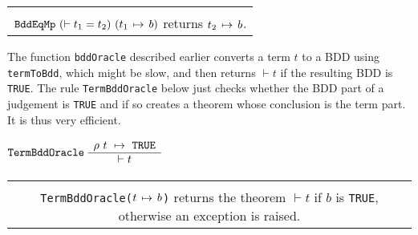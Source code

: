 \documentclass[12pt]{article}
\newcommand{\bnind}[1]{\index[MLbn]{#1}}
\newlength{\minipagewidth}
\newcommand{\ty}[1]{\mbox{\tt #1}}
\newcommand{\ml}[1]{{\tt #1}}
\newcommand{\termbdd}[3]{\mbox{$#1~#2~\mapsto~#3$}}
\newcommand{\globtermbdd}[2]{\mbox{$#1\hspace{0.5mm}\mapsto\hspace{0.5mm}#2$}}
\newcommand\termbddty{\ty{term\_bdd}}
\newcommand\fun{\mbox{\tt{->}}}
\begin{document}
\vspace*{-4mm}
\begin{flushleft}
\begin{tabular}{|c|}\hline
\begin{minipage}{\minipagewidth}
\smallskip
\begin{footnotesize}
\begin{description}


\item $\ml{BddEqMp}\bnind{\ml{BddEqMp}}:\ty{thm}\fun\termbddty\fun\termbddty$\\
$\ml{BddEqMp}~(\vdash t_1=t_2)~(\globtermbdd{t_1}{b})$ returns
$\globtermbdd{t_2}{b}$.



\end{description}
\end{footnotesize}
\smallskip
\end{minipage}\\ \hline
\end{tabular}
\end{flushleft}

The function \ml{bddOracle} described earlier converts a term $t$ to a
BDD using \ml{termToBdd}, which might be slow, and then returns
$\vdash t$ if the resulting BDD is \ml{TRUE}.  The rule
\ml{TermBddOracle}\bnind{\ml{TermBddOracle}} below just checks whether the BDD part of a
judgement is \ml{TRUE} and if so creates a theorem whose conclusion is the term part.
It is thus very efficient. 

\smallskip

$\ml{TermBddOracle}~\begin{array}{c}
\termbdd{\rho}{t}{\ml{TRUE}}
\\ \hline
\vdash t
\end{array}$

\vspace*{-4mm}
\begin{flushleft}
\begin{tabular}{|c|}\hline
\begin{minipage}{\minipagewidth}
\smallskip
\begin{footnotesize}
\begin{description}

\item
$\ml{TermBddOracle}\bnind{\ml{TermBddOracle}}:\termbddty\fun\ty{thm}$\\
\ml{TermBddOracle($\globtermbdd{t}{b}$)} returns the theorem $\vdash t$ if
$b$ is \ml{TRUE}, otherwise an exception is raised.


\end{description}
\end{footnotesize}
\smallskip
\end{minipage}\\ \hline
\end{tabular}
\end{flushleft}
\end{document}
